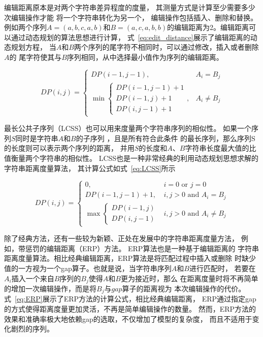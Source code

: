 编辑距离原本是对两个字符串差异程度的度量，
其测量方式是计算至少需要多少次编辑操作才能
将一个字符串转化为另一个，
编辑操作包括插入、删除和替换\cite{DBLP:journals/prl/Gorecki14}。
例如两个序列$A=\left(a,b,c,a,b\right)$和$B=\left(a,c,a,b,b\right)$的编辑距离为2。编辑距离可以通过动态规划的算法思想进行计算，
式~\ref{eq:edit_distance}展示了编辑距离的动态规划方程，
当$A$和$B$两个序列的尾字符不相同时，可以通过修改，插入或者删除$A$的
尾字符使其与$B$序列相同，从中选择最小值作为序列的编辑距离。


\begin{equation}
  DP(i, j)= \begin{cases}DP(i-1, j-1), & A_{i}=B_{j} \\
    \min \left\{\begin{array}{c}
    D P(i-1, j-1)+1 \\
    D P(i-1, j)+1 \\
    D P(i, j-1)+1
    \end{array}\right. , & A_{i} \neq B_{j}
  \end{cases}
  \label{eq:edit_distance}
\end{equation}

最长公共子序列（LCSS）也可以用来度量两个字符串序列的相似性。
如果一个序列$S$同时是字符串$A$和$B$的子序列
\cite{DBLP:conf/spire/BergrothHR00}，且是所有符合此条件
的最长序列，那么序列S的长度则可以表示两个序列的距离，
并用$S$的长度和$A$、$B$字符串长度最大值的比值衡量两个字符串的相似性。
LCSS也是一种非常经典的利用动态规划思想求解的字符串距离度量算法，
其计算公式如式~\ref{eq:LCSS}所示

\begin{equation}
  D P(i, j)= \begin{cases}0, & i=0 \text { or } j=0 \\ D P(i-1, j-1)+1, & i, j>0 \text { and } A_{i}=B_{j} \\ \max \begin{cases}D P(i-1, j) \\ D P(i, j-1)\end{cases} & i, j>0 \text { and } A_{i} \neq B_{j}\end{cases}
  \label{eq:LCSS}
\end{equation}

除了经典方法，还有一些较为新颖、正处在发展中的字符串距离度量方法，
例如，带惩罚的编辑距离（ERP）方法\cite{DBLP:conf/vldb/ChenN04}。
ERP算法也是一种基于编辑距离的
字符串距离度量算法。相比经典编辑距离，ERP算法是将匹配过程中插入或删除
时缺少值的一方视为一个gap算子。也就是说，当字符串序列$A$和$B$进行匹配时，
若要在$A_i$插入一个来自$B$序列的$B_j$使得$A$和$B$更为接近时，那么
在距离度量时将不再简单的增加一次编辑操作，而是将$B_j$与$gap$算子的距离视为
本次编辑操作的代价。式~\ref{eq:ERP}展示了ERP方法的计算公式，相比经典编辑距离，
ERP通过指定gap的方式使得距离度量更加灵活，不再是简单编辑操作的数量。
然而，ERP方法的效果和准确率极大地依赖gap的选取，不仅增加了模型的复杂度，
而且不适用于变化剧烈的序列。

